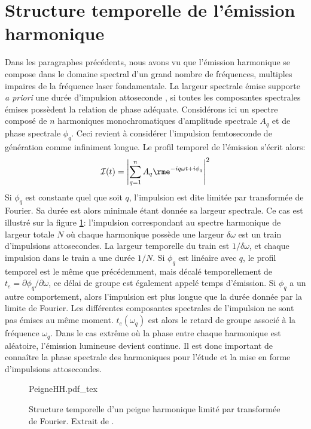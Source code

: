 \section{Structure temporelle de l'émission harmonique}
Dans les paragraphes précédents, nous avons vu que l'émission harmonique se compose dans le domaine spectral d'un grand nombre de fréquences, multiples impaires de la fréquence laser fondamentale. La largeur spectrale émise supporte \textit{a priori} une durée d'impulsion attoseconde , si toutes les composantes spectrales émises possèdent la relation de phase adéquate. Considérons ici un spectre composé de $n$ harmoniques monochromatiques d'amplitude spectrale $A_q$ et de phase spectrale $\phi_q$. Ceci revient à considérer l'impulsion femtoseconde de génération comme infiniment longue. Le profil temporel de l'émission s'écrit alors:
\begin{equation}
\mathcal{I}(t) = \left| \sum_{q=1}^n A_q \rme^{-iq\omega t + i \phi_q} \right|^2
\end{equation}
Si $\phi_q$ est constante quel que soit $q$, l'impulsion est dite limitée par transformée de Fourier. Sa durée est alors minimale étant donnée sa largeur spectrale. Ce cas est illustré sur la figure \ref{fig:PeigneHH}: l'impulsion correspondant au spectre harmonique de largeur totale $N$ où chaque harmonique possède une largeur $\delta \omega$ est un train d'impulsions attosecondes. La largeur temporelle du train est $1/\delta \omega$, et chaque impulsion dans le train a une durée $1/N$. Si $\phi_q$ est linéaire avec $q$, le profil temporel est le même que précédemment, mais décalé temporellement de $t_e = \partial \phi_q / \partial \omega$, ce délai de groupe est également appelé temps d'émission. Si $\phi_q$ a un autre comportement, alors l'impulsion est plus longue que la durée donnée par la limite de Fourier. Les différentes composantes spectrales de l'impulsion ne sont pas émises au même moment. $t_e (\omega_q)$ est alors le retard de groupe associé à la fréquence $\omega_q$. Dans le cas extrême où la phase entre chaque harmonique est aléatoire, l'émission lumineuse devient continue. Il est donc important de connaître la phase spectrale des harmoniques pour l'étude et la mise en forme d'impulsions attosecondes.

\begin{figure}
\centering
\def\svgwidth{\columnwidth}
{PeigneHH.pdf_tex}
\caption{Structure temporelle d'un peigne harmonique limité par transformée de Fourier. Extrait de .}
\label{fig:PeigneHH}
\end{figure}

